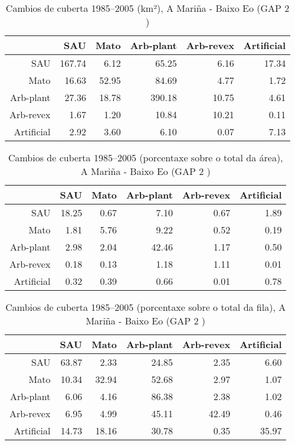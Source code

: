\clearpage
\begin{table}[p]
\centering
\caption{Cambios de cuberta 1985--2005 (km²), A Mariña - Baixo Eo (GAP 2 )} 
\label{TaboaContinxGAP2}
\begin{tabular}{rrrrrr}
  \hline
 & SAU & Mato & Arb-plant & Arb-revex & Artificial \\ 
  \hline
SAU & 167.74 & 6.12 & 65.25 & 6.16 & 17.34 \\ 
  Mato & 16.63 & 52.95 & 84.69 & 4.77 & 1.72 \\ 
  Arb-plant & 27.36 & 18.78 & 390.18 & 10.75 & 4.61 \\ 
  Arb-revex & 1.67 & 1.20 & 10.84 & 10.21 & 0.11 \\ 
  Artificial & 2.92 & 3.60 & 6.10 & 0.07 & 7.13 \\ 
   \hline
\end{tabular}
\end{table}
\begin{table}[p]
\centering
\caption{Cambios de cuberta 1985--2005 (porcentaxe sobre o total da área), A Mariña - Baixo Eo (GAP 2 )} 
\label{TaboaContinxPTGAP2}
\begin{tabular}{rrrrrr}
  \hline
 & SAU & Mato & Arb-plant & Arb-revex & Artificial \\ 
  \hline
SAU & 18.25 & 0.67 & 7.10 & 0.67 & 1.89 \\ 
  Mato & 1.81 & 5.76 & 9.22 & 0.52 & 0.19 \\ 
  Arb-plant & 2.98 & 2.04 & 42.46 & 1.17 & 0.50 \\ 
  Arb-revex & 0.18 & 0.13 & 1.18 & 1.11 & 0.01 \\ 
  Artificial & 0.32 & 0.39 & 0.66 & 0.01 & 0.78 \\ 
   \hline
\end{tabular}
\end{table}
\begin{table}[p]
\centering
\caption{Cambios de cuberta 1985--2005 (porcentaxe sobre o total da fila), A Mariña - Baixo Eo (GAP 2 )} 
\label{TaboaContinxPFGAP2}
\begin{tabular}{rrrrrr}
  \hline
 & SAU & Mato & Arb-plant & Arb-revex & Artificial \\ 
  \hline
SAU & 63.87 & 2.33 & 24.85 & 2.35 & 6.60 \\ 
  Mato & 10.34 & 32.94 & 52.68 & 2.97 & 1.07 \\ 
  Arb-plant & 6.06 & 4.16 & 86.38 & 2.38 & 1.02 \\ 
  Arb-revex & 6.95 & 4.99 & 45.11 & 42.49 & 0.46 \\ 
  Artificial & 14.73 & 18.16 & 30.78 & 0.35 & 35.97 \\ 
   \hline
\end{tabular}
\end{table}
